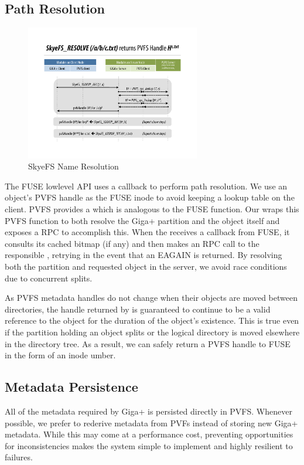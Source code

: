 \documentclass[onecolumn, 11pt, letterpaper]{article}
\begin{document}
\subsection{Path Resolution}
\begin{figure}
\begin{center}
\includegraphics[width=3in]{figure-resolve}
\end{center}
\caption{SkyeFS Name Resolution}
\end{figure}
The FUSE lowlevel API uses a  callback to perform
path resolution.  We use an object's PVFS handle as the FUSE inode to
avoid keeping a lookup table on the client.  PVFS provides a
 which is analogous to the
FUSE  function.  Our  wraps this PVFS function
to both resolve the Giga+ partition and the object itself and exposes a
 RPC to accomplish this.  When the  receives a
 callback from FUSE, it consults its cached bitmap (if any) and then
makes an RPC call to the responsible , retrying in the
event that an EAGAIN is returned.  By resolving both the partition and
requested object in the server, we avoid race conditions due to concurrent
splits.  

As PVFS metadata handles do not change when their objects are moved between
directories, the handle returned by  is guaranteed to continue to
be a valid reference to the object for the duration of the object's existence.
This is true even if the partition holding an object splits or the logical
directory is moved elsewhere in the directory tree.  As a result, we can
safely return a PVFS handle to FUSE in the form of an inode umber.

\subsection{Metadata Persistence}
All of the metadata required by Giga+ is persisted directly in PVFS.  Whenever
possible, we prefer to rederive metadata from PVFs instead of storing new
Giga+ metadata.  While this may come at a performance cost, preventing
opportunities for inconsistencies makes the system
simple to implement and highly resilient to failures.
\end{document}
